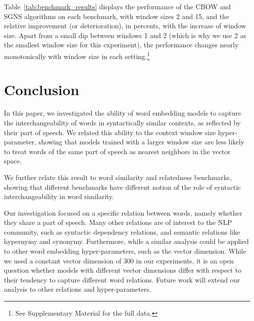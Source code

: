 \documentclass[11pt,a4paper]{article}
\begin{document}
    Table~\ref{tab:benchmark_results} displays the performance of the CBOW and SGNS
    algorithms on each benchmark, with window sizes 2 and 15,
    and the relative improvement (or deterioration),
    in percents, with the increase of window size.
    Apart from a small dip between windows 1 and 2
    (which is why we use 2 as the smallest window size for this experiment),
    the performance changes nearly monotonically with window size in each
    setting.\footnote{See Supplementary Material for the full data.}
    
    


\section{Conclusion}\label{sec:conclusion}

    In this paper, we investigated the ability of word embedding models
    to capture the interchangeability of words in syntactically similar contexts,
    as reflected by their part of speech.
    We related this ability to the context window size hyper-parameter,
    showing that models trained with a larger window size
    are less likely to treat words of the same part of speech as nearest neighbors
    in the vector space.

    We further relate this result to word similarity and relatedness benchmarks,
    showing that different benchmarks have different notion of the role of
    syntactic interchangeability in word similarity.
    
    Our investigation focused on a specific relation between words,
    namely whether they share a part of speech.
    Many other relations are of interest to the NLP
    community, such as syntactic dependency relations,
    and semantic relations like hypernymy and synonymy.
    Furthermore, while a similar analysis could be applied to other word
    embedding hyper-parameters, such as the vector dimension.
    While we used a constant vector dimension of 300 in our experiments,
    it is an open question whether models with different vector dimensions
    differ with respect to their tendency to capture different word relations.
    Future work will extend our analysis to other relations and hyper-parameters.
\end{document}
